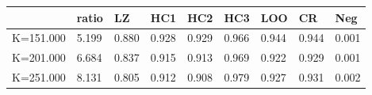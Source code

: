 \begin{table}[ht]
\centering
\begin{tabular}{rllllllll}
  \hline
 & ratio & LZ & HC1 & HC2 & HC3 & LOO & CR & Neg \\ 
  \hline
K=151.000 & 5.199 & 0.880 & 0.928 & 0.929 & 0.966 & 0.944 & 0.944 & 0.001 \\ 
  K=201.000 & 6.684 & 0.837 & 0.915 & 0.913 & 0.969 & 0.922 & 0.929 & 0.001 \\ 
  K=251.000 & 8.131 & 0.805 & 0.912 & 0.908 & 0.979 & 0.927 & 0.931 & 0.002 \\ 
   \hline
\end{tabular}
\end{table}
